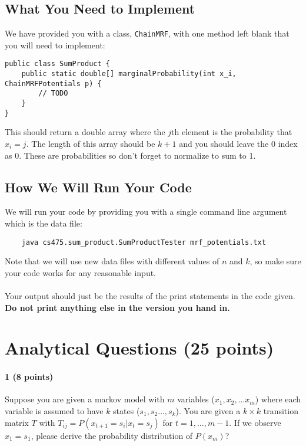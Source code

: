 \documentclass[11pt]{article}
\newcommand{\code}[1]{{\footnotesize \tt #1}}
\begin{document}
\subsection{What You Need to Implement} %
We have provided you with a class, \code{ChainMRF}, with one method left blank that you will need to implement:
\begin{verbatim}
public class SumProduct {
    public static double[] marginalProbability(int x_i, ChainMRFPotentials p) {
        // TODO
    }
}
\end{verbatim}
This should return a double array where the $j$th element is the probability that $x_i = j$. The length of this array should be $k+1$ and you should leave the 0 index as 0. These are probabilities so don't forget to normalize to sum to 1.


\subsection{How We Will Run Your Code} %
We will run your code by providing you with a single command line argument which is the data file:
\begin{verbatim}
    java cs475.sum_product.SumProductTester mrf_potentials.txt
\end{verbatim}
Note that we will use new data files with different values of $n$ and $k$, so make sure your code works for any reasonable input.\\
\\
Your output should just be the results of the print statements in the code given. {\bf Do not print anything else in the version you hand in.}


\section{Analytical Questions (25 points)}

\paragraph{1 (8 points)} Suppose you are given a markov model with $m$ variables ($x_1,x_2, \ldots x_m$) where each variable is assumed to have $k$ states ($s_1, s_2 \ldots, s_k$). You are given a $k \times k$ transition matrix $T$ with $T_{ij} = P(x_{t+1} = s_i | x_{t} = s_j)$ for $t = 1,...,m-1$. If we observe $x_1 = s_1$, please derive the probability distribution of $P(x_m)$?
\end{document}

